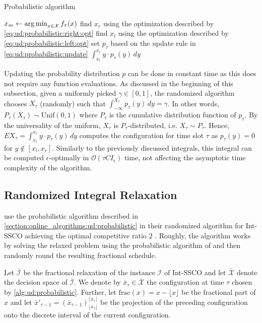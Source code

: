 \begin{algorithm}
    \caption{Probabilistic algorithm \cite{Bansal2015}}\label{alg:ud:probabilistic}
    $x_m \gets \operatorname*{arg\,min}_{x \in \mathcal{X}} f_{\tau}(x)$\;
    find $x_r$ using the optimization described by \autoref{eq:ud:probabilistic:right:opt}\;
    find $x_l$ using the optimization described by \autoref{eq:ud:probabilistic:left:opt}\;
    set $p_{\tau}$ based on the update rule in \autoref{eq:ud:probabilistic:update}\;
    \Return $\int_{x_l}^{x_r} y \cdot p_{\tau}(y) \,dy$\;
\end{algorithm}

Updating the probability distribution $p$ can be done in constant time as this does not require any function evaluations. As discussed in the beginning of this subsection, given a uniformly picked $\gamma \in [0,1]$, the randomized algorithm chooses $X_{\tau}$ (randomly) such that $\int_{-\infty}^{X_{\tau}} p_{\tau}(y) \,dy = \gamma$. In other words, $P_{\tau}(X_{\tau}) \sim \text{Unif}(0,1)$ where $P_{\tau}$ is the cumulative distribution function of $p_{\tau}$. By the universality of the uniform, $X_{\tau}$ is $P_{\tau}$-distributed, i.e. $X_{\tau} \sim P_{\tau}$. Hence, $E X_{\tau} = \int_{x_l}^{x_r} y \cdot p_{\tau}(y) \,dy$ computes the configuration for time slot $\tau$ as $p_{\tau}(y) = 0$ for $y \not\in [x_l, x_r]$. Similarly to the previously discussed integrals, this integral can be computed $\epsilon$-optimally in $\mathcal{O}(\tau C I_{\epsilon})$ time, not affecting the asymptotic time complexity of the algorithm.

\subsection{Randomized Integral Relaxation}

\citeauthor*{Albers2018} use the probabilistic algorithm described in \autoref{section:online_algorithms:ud:probabilistic} in their randomized algorithm for Int-SSCO achieving the optimal competitive ratio $2$ \cite{Albers2018}. Roughly, the algorithm works by solving the relaxed problem using the probabilistic algorithm of \citeauthor*{Bansal2015} and then randomly round the resulting fractional schedule.

Let $\bar{\mathcal{I}}$ be the fractional relaxation of the instance $\mathcal{I}$ of Int-SSCO and let $\bar{\mathcal{X}}$ denote the decision space of $\bar{\mathcal{I}}$. We denote by $\bar{x}_{\tau} \in \bar{\mathcal{X}}$ the configuration at time $\tau$ chosen by \autoref{alg:ud:probabilistic}. Further, let $\text{frac}(x) = x - \lfloor x \rfloor$ be the fractional part of $x$ and let $\bar{x}'_{\tau-1} = (\bar{x}_{\tau-1})_{\lfloor\bar{x}_{\tau}\rfloor}^{\lceil\bar{x}_{\tau}\rceil}$ be the projection of the preceding configuration onto the discrete interval of the current configuration.

